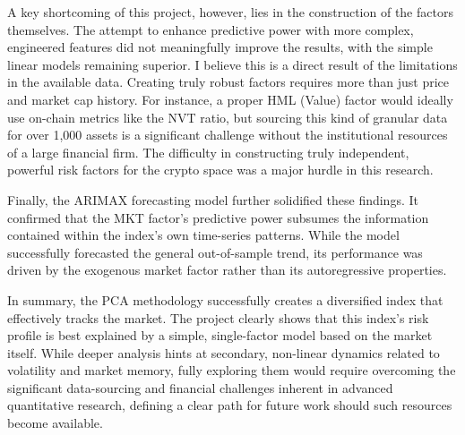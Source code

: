 \documentclass[12pt]{article}
\begin{document}
A key shortcoming of this project, however, lies in the construction of the factors themselves. The attempt to enhance predictive power with more complex, engineered features did not meaningfully improve the results, with the simple linear models remaining superior. I believe this is a direct result of the limitations in the available data. Creating truly robust factors requires more than just price and market cap history. For instance, a proper HML (Value) factor would ideally use on-chain metrics like the NVT ratio, but sourcing this kind of granular data for over 1,000 assets is a significant challenge without the institutional resources of a large financial firm. The difficulty in constructing truly independent, powerful risk factors for the crypto space was a major hurdle in this research.

Finally, the ARIMAX forecasting model further solidified these findings. It confirmed that the MKT factor's predictive power subsumes the information contained within the index's own time-series patterns. While the model successfully forecasted the general out-of-sample trend, its performance was driven by the exogenous market factor rather than its autoregressive properties.

In summary, the PCA methodology successfully creates a diversified index that effectively tracks the market. The project clearly shows that this index's risk profile is best explained by a simple, single-factor model based on the market itself. While deeper analysis hints at secondary, non-linear dynamics related to volatility and market memory, fully exploring them would require overcoming the significant data-sourcing and financial challenges inherent in advanced quantitative research, defining a clear path for future work should such resources become available.
\end{document}
